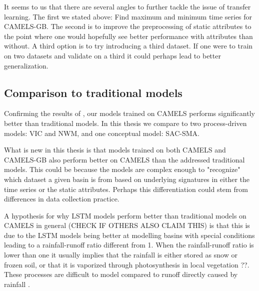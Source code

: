 It seems to us that there are several angles to further tackle the issue of transfer 
learning. The first we stated above: Find maximum and minimum time series for 
CAMELS-GB. The second is to improve the preprocessing of static attributes to 
the point where one would hopefully see better performance with attributes than 
without. A third option is to try introducing a third dataset. If one were to 
train on two datasets and validate on a third it could perhaps lead to better 
generalization. 
\subsection{Comparison to traditional models}
Confirming the results of \citet{lstm_second_paper,lstm_third_paper}, our models 
trained on CAMELS performs significantly better than traditional models. In this 
thesis we compare to two process-driven models: VIC and NWM, and one conceptual 
model: SAC-SMA. 

What is new in this thesis is that models trained on both CAMELS and CAMELS-GB 
also perform better on CAMELS than the addressed traditional models. This could 
be because the models are complex enough to "recognize" which dataset a given 
basin is from based on underlying signatures in either the time series or the 
static attributes. Perhaps this differentiation could stem from differences in 
data collection practice. 

A hypothesis for why LSTM models perform better than traditional models on CAMELS in general
(CHECK IF OTHERS ALSO CLAIM THIS) \citationneeded is that this is due to the LSTM 
models being better at modelling basins with special conditions leading to 
a rainfall-runoff ratio different from 1. When the rainfall-runoff ratio is lower 
than one it usually implies that the rainfall is either stored as snow or frozen 
soil, or that it is vaporized through photosynthesis in local vegetation \citationneeded ??. 
These processes are difficult to model compared to runoff directly caused by 
rainfall \citationneeded.
